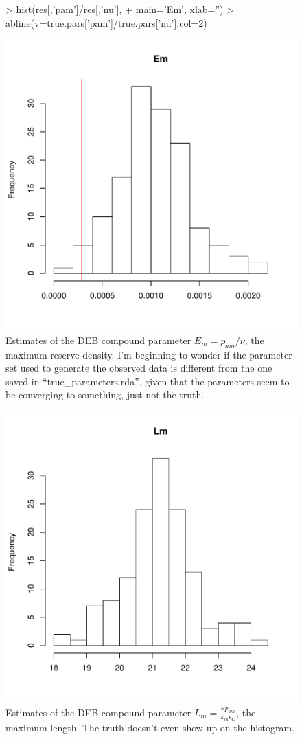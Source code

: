 \documentclass[12pt,reqno,final]{amsart}
\theoremstyle{plain}
\numberwithin{equation}{part}
\begin{document}
\begin{figure}
\begin{Schunk}
\begin{Sinput}
> hist(res[,'pam']/res[,'nu'],
+      main='Em', xlab='')
> abline(v=true.pars['pam']/true.pars['nu'],col=2)
\end{Sinput}
\end{Schunk}
\includegraphics{Solving_the_problem_of_parameter_covariation_3-009}
\caption{Estimates of the DEB compound parameter $E_m = p_{am}/\nu$,
  the maximum reserve density. I'm beginning to wonder if the
  parameter set used to generate the observed data is different from
  the one saved in ``true\_parameters.rda'', given that the parameters
  seem to be converging to something, just not the truth.}
\end{figure}

\begin{figure}
\includegraphics{Solving_the_problem_of_parameter_covariation_3-010}
\caption{Estimates of the DEB compound parameter $L_m = \frac{\kappa
    p_{am}}{k_m \epsilon_G}$, the maximum length. The truth doesn't
  even show up on the histogram.}
\end{figure}
\end{document}
